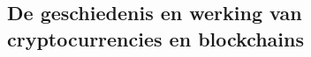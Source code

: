 \chapter{}
\label{ch:stand-van-zaken}



%








\section{De geschiedenis en werking van cryptocurrencies en blockchains}

